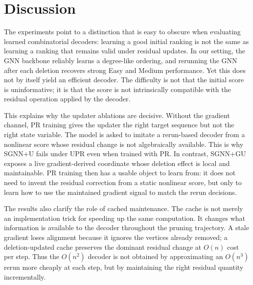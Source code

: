 \documentclass[11pt]{article}
\theoremstyle{plain}
\theoremstyle{remark}
\begin{document}

\section{Discussion}
\label{sec:discussion}

The experiments point to a distinction that is easy to obscure when evaluating
learned combinatorial decoders: learning a good initial ranking is not the same
as learning a ranking that remains valid under residual updates. In our setting,
the GNN backbone reliably learns a degree-like ordering, and rerunning the GNN
after each deletion recovers strong Easy and Medium performance. Yet this does
not by itself yield an efficient decoder. The difficulty is not that the initial
score is uninformative; it is that the score is not intrinsically compatible with
the residual operation applied by the decoder.

This explains why the updater ablations are decisive. Without the gradient
channel, PR training gives the updater the right target sequence but not the
right state variable. The model is asked to imitate a rerun-based decoder from
a nonlinear score whose residual change is not algebraically available. This
is why SGNN+U fails under UPR even when trained with PR. In contrast, SGNN+GU
exposes a live gradient-derived coordinate whose deletion effect is local and
maintainable. PR training then has a usable object to learn from: it does not
need to invent the residual correction from a static nonlinear score, but only
to learn how to use the maintained gradient signal to match the rerun decisions.

The results also clarify the role of cached maintenance. The cache is not merely
an implementation trick for speeding up the same computation. It changes what
information is available to the decoder throughout the pruning trajectory. A
stale gradient loses alignment because it ignores the vertices already removed;
a deletion-updated cache preserves the dominant residual change at $O(n)$ cost
per step. Thus the $O(n^2)$ decoder is not obtained by approximating an
$O(n^3)$ rerun more cheaply at each step, but by maintaining the right residual
quantity incrementally.
\end{document}
